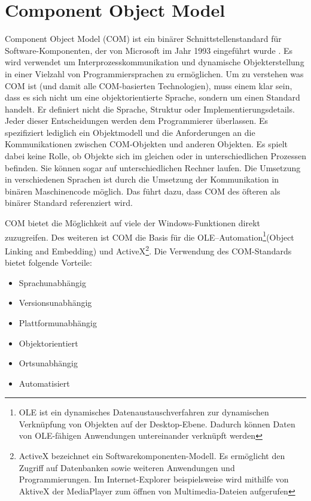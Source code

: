 \section{Component Object Model}
\label{ch:grundlagen:sec:ComponentObjectModel}

Component Object Model (COM) ist ein binärer Schnittstellenstandard für Software-Komponenten, der von Microsoft im Jahr 1993 eingeführt wurde \cite{SWB-088582566}. Es wird verwendet um Interprozesskommunikation und dynamische Objekterstellung in einer Vielzahl von Programmiersprachen zu ermöglichen. Um zu verstehen was COM ist (und damit alle COM-basierten Technologien), muss einem klar sein, dass es sich nicht um eine objektorientierte Sprache, sondern um einen Standard handelt. Er definiert nicht die Sprache, Struktur oder Implementierungsdetails. Jeder dieser Entscheidungen werden dem Programmierer überlassen. Es spezifiziert lediglich ein Objektmodell und die Anforderungen an die Kommunikationen zwischen COM-Objekten und anderen Objekten. Es spielt dabei keine Rolle, ob Objekte sich im gleichen oder in unterschiedlichen Prozessen befinden. Sie können sogar auf unterschiedlichen Rechner laufen. Die Umsetzung in verschiedenen Sprachen ist durch die Umsetzung der Kommunikation in binären Maschinencode möglich. Das führt dazu, dass COM des öfteren als binärer Standard referenziert wird.

COM bietet die Möglichkeit auf viele der Windows-Funktionen direkt zuzugreifen. Des weiteren ist COM die Basis für die OLE–Automation\footnote{OLE ist ein dynamisches Datenaustauschverfahren zur dynamischen Verknüpfung von Objekten auf der Desktop-Ebene. Dadurch können Daten von OLE-fähigen Anwendungen untereinander verknüpft werden}(Object Linking and Embedding) und ActiveX\footnote{ActiveX bezeichnet ein Softwarekomponenten-Modell. Es ermöglicht den Zugriff auf Datenbanken sowie weiteren Anwendungen und Programmierungen. Im Internet-Explorer beispielsweise wird mithilfe von AktiveX der MediaPlayer zum öffnen von Multimedia-Dateien aufgerufen}. Die Verwendung des COM-Standards bietet folgende Vorteile:

\begin{itemize}
\item Sprachunabhängig
\item Versionsunabhängig
\item Plattformunabhängig
\item Objektorientiert
\item Ortsunabhängig
\item Automatisiert
\end{itemize} 

